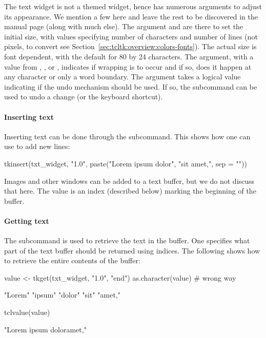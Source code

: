 The text widget is not a themed widget, hence has numerous arguments
to adjust its appearance. We mention a few here and leave the rest to
be discovered in the manual page (along with much else). The argument
 and  are there to
set the initial size, with values specifying number of characters and
number of lines (not pixels, to convert see
Section~\ref{sec:tcltk:overview:colors-fonts}). The actual size is
font dependent, with the default for 80 by 24 characters. The
 argument, with a value from ,
, or , indicates if wrapping is to occur and
if so, does it happen at any character or only a word boundary. The
argument  takes a logical value indicating if
the undo mechanism should be used. If so, the subcommand
 can be used to undo a change (or the
 keyboard shortcut).

\paragraph{Inserting text}
Inserting text can be done through the 
subcommand. This shows how one can use  to add new
lines:
\begin{Schunk}
\begin{Sinput}
 tkinsert(txt_widget, 
          "1.0", 
          paste("Lorem ipsum dolor",
                "sit amet,", sep = "\n"))
\end{Sinput}
\end{Schunk}
Images and other windows can be added to a text buffer, but we do not
discuss that here. The value  is an index (described below)
marking the beginning of the buffer.

\paragraph{Getting text}
The  subcommand is used to retrieve the text
in the buffer. One specifies what part of the text buffer should be
returned using indices. The following shows how to retrieve the entire
contents of the buffer:

\begin{Schunk}
\begin{Sinput}
 value <- tkget(txt_widget, "1.0", "end")
 as.character(value)                     # wrong way
\end{Sinput}
\begin{Soutput}
[1] "Lorem" "ipsum" "dolor" "sit"   "amet,"
\end{Soutput}
\begin{Sinput}
 tclvalue(value)
\end{Sinput}
\begin{Soutput}
[1] "Lorem ipsum dolor\nsit amet,\n"
\end{Soutput}
\end{Schunk}

